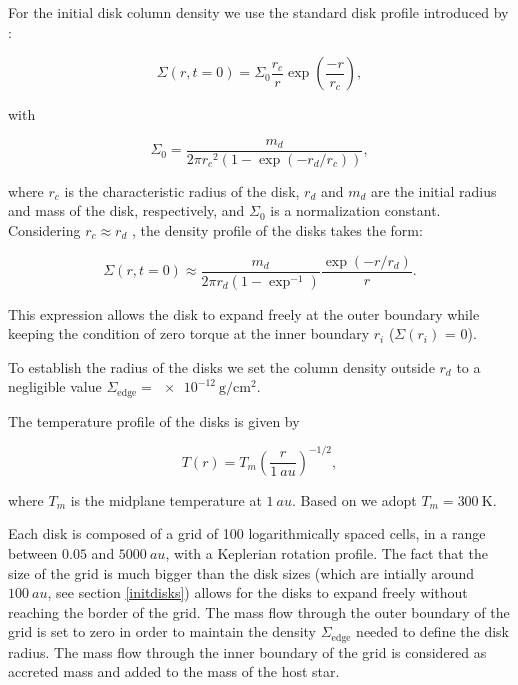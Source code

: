 \documentclass[fleqn,usenatbib]{mnras}
\begin{document}
For the initial disk column density we use the standard disk profile introduced by \citet{lynden-bell1974}:

\begin{equation}\label{profile}
\Sigma(r, t=0) = \Sigma_0 \frac{r_c}{r} \exp\left(\frac{-r}{r_c}\right),
\end{equation}

\noindent
with

\begin{equation}
\Sigma_0 = \frac{m_d}{2 \pi {r_c}^2 \left(1 - \exp\left(-r_d/r_c\right)\right)},
\end{equation}

\noindent
where $r_c$ is the characteristic radius of the disk, $r_d$ and $m_d$ are the initial radius and mass of the disk, respectively, and $\Sigma_0$ is a normalization constant. Considering $r_c \approx r_d$ \citep{anderson2013}, the density profile of the disks takes the form:

\begin{equation}
\Sigma(r, t=0) \approx \frac{m_d}{2 \pi r_d \left(1 - \exp^{-1}\right)} \frac{\exp(-r/r_d)}{r}.
\end{equation}

This expression allows the disk to expand freely at the outer boundary while keeping the condition of zero torque at the inner boundary $r_i$ ($\Sigma(r_i)$ = 0).

To establish the radius of the disks we set the column density outside $r_d$ to a negligible value $\Sigma_{\mathrm{edge}} = \SI{e-12}{\gram\per\square\cm}$. 

The temperature profile of the disks is given by

\begin{equation}
T(r) = T_m \left(\frac{r}{\SI{1}{au}}\right)^{-1/2},
\end{equation}

\noindent
where $T_m$ is the midplane temperature at $\SI{1}{au}$. Based on \citet{anderson2013} we adopt $T_m = \SI{300}{\K}$.

Each disk is composed of a grid of 100 logarithmically spaced cells, in a range between $0.05$ and $\SI{5000}{au}$, with a Keplerian rotation profile. The fact that the size of the grid is much bigger than the disk sizes (which are intially around $\SI{100}{au}$, see section \ref{initdisks}) allows for the disks to expand freely without reaching the border of the grid. The mass flow through the outer boundary of the grid is set to zero in order to maintain the density $\Sigma_{\mathrm{edge}}$ needed to define the disk radius. The mass flow through the inner boundary of the grid is considered as accreted mass and added to the mass of the host star.
\end{document}
